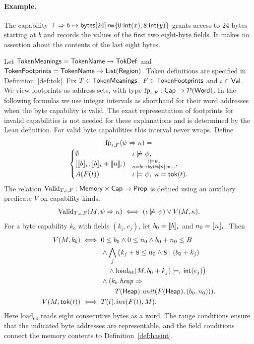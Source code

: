 \paragraph{Example.} The capability $\top\Rightarrow b\mapsto\mathsf{bytes}[24]\,\mathsf{rw}\{0{:}\mathsf{int}(x),8{:}\mathsf{int}(y)\}$ grants access to 24 bytes starting at $b$ and records the values of the first two eight-byte fields. It makes no assertion about the contents of the last eight bytes.


\begin{definition}\label{def:valid}
Let $\mathsf{TokenMeanings}=\mathsf{TokenName}\to\mathsf{TokDef}$ and $\mathsf{TokenFootprints}=\mathsf{TokenName}\to\mathsf{List}(\mathsf{Region})$. Token definitions are specified in Definition~\ref{def:tok}. Fix $T\in\mathsf{TokenMeanings}$, $F\in\mathsf{TokenFootprints}$ and $\iota\in\mathsf{Val}$. We view footprints as address sets, with type $\mathrm{fp}_{\iota,F}:\mathsf{Cap}\to\mathcal P(\mathsf{Word})$. In the following formulas we use integer intervals as shorthand for their word addresses when the byte capability is valid. The exact representation of footprints for invalid capabilities is not needed for these explanations and is determined by the Lean definition. For valid byte capabilities this interval never wraps. Define
\[
\begin{gathered}\fp_{\iota,F}(\psi\Rightarrow\kappa)=\\[-2pt]\begin{cases}
\emptyset&\iota\not\models\psi,\\
[\ev{b}{\iota},\ev{b}{\iota}+\ev{n}{\iota})&\substack{\iota\models\psi,\\ \kappa=\bytes{b}{n}{m}\ldots},\\
A(F(t))&\iota\models\psi,\ \kappa=\mathsf{tok}(t).\end{cases}\end{gathered}
\]
The relation $\mathrm{Valid}_{T,\iota,F}:\mathsf{Memory}\times\mathsf{Cap}\to\mathsf{Prop}$ is defined using an auxiliary predicate $V$ on capability kinds.
\[
\mathrm{Valid}_{T,\iota,F}(M,\psi\Rightarrow\kappa)\iff(\iota\not\models\psi)\lor V(M,\kappa).
\]
For a byte capability $k_b$ with fields $(k_j,e_j)$, let $b_0=[\![b]\!]_{\iota}$ and $n_0=[\![n]\!]_{\iota}$. Then
\[
\begin{aligned}
V(M,k_b)\iff{}&0\le b_0\land0\le n_0\land b_0+n_0\le B\\
&\land\bigwedge_j\big(k_j+8\le n_0\land8\mid(b_0+k_j)\\
&\quad\land\mathrm{load}_{64}(M,b_0+k_j)\models_\iota\mathsf{int}(e_j)\big)\\
&\land( k_b.\mathit{heap}\Rightarrow\\ &\qquad T(\mathsf{Heap}).\mathit{unit}(F(\mathsf{Heap}),(b_0,n_0))).\\
V(M,\mathsf{tok}(t))\iff{}&T(t).\mathit{inv}(F(t),M).
\end{aligned}
\]
Here $\mathrm{load}_{64}$ reads eight consecutive bytes as a word. The range conditions ensure that the indicated byte addresses are representable, and the field conditions connect the memory contents to Definition~\ref{def:hasint}.
\end{definition}

